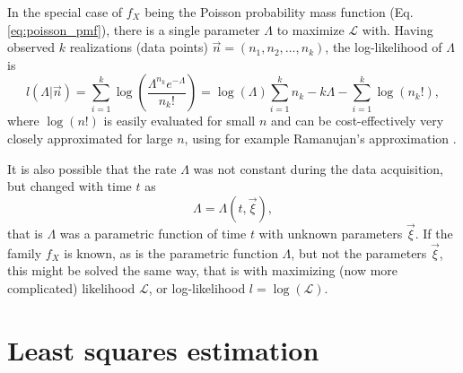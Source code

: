 In the special case of $f_X$ being the Poisson probability mass function (Eq. \ref{eq:poisson_pmf}), there is a single parameter $\Lambda$ to maximize $\mathcal{L}$ with. Having observed $k$ realizations (data points) $\vec{n} = (n_1, n_2, \dots , n_k)$, the log-likelihood of $\Lambda$ is
\begin{equation}
    l(\Lambda|\vec{n}) = \sum_{i=1}^k \log \left( \frac{\Lambda^{n_k} e^{-\Lambda}}{n_k!} \right) = \log(\Lambda) \sum_{i=1}^k n_k - k \Lambda - \sum_{i=1}^k \log(n_k!),  
\end{equation}
where $\log(n!)$ is easily evaluated for small $n$ and can be cost-effectively very closely approximated for large $n$, using for example Ramanujan's approximation \citep{ramanujan1988lost}. 

It is also possible that the rate $\Lambda$ was not constant during the data acquisition, but changed with time $t$ as
\begin{equation}
    \Lambda = \Lambda(t,\vec{\xi}), \label{eq:compound_model}
\end{equation}
that is $\Lambda$ was a parametric function of time $t$ with unknown parameters $\vec{\xi}$. If the family $f_X$ is known, as is the parametric function $\Lambda$, but not the parameters $\vec{\xi}$, this might be solved the same way, that is with maximizing (now more complicated) likelihood $\mathcal{L}$, or log-likelihood $l = \log(\mathcal{L})$. 

\section{Least squares estimation}

